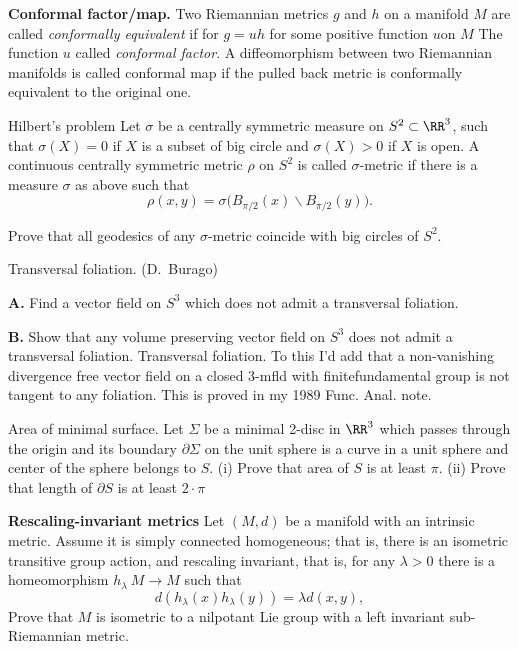 \item{\bf Conformal factor/map.} Two Riemannian metrics $g$ and $h$ on a manifold $M$ are called {\it conformally equivalent} if for $g=u h$ for some positive function $u$on $M$
The function $u$ called {\it conformal factor}.
A diffeomorphism between two Riemannian manifolds is called conformal map if the pulled back metric is conformally equivalent to the original one.

\begin{pr}{}{Hilbert's problem} Let $\sigma$ be a centrally
symmetric measure on $S^2\subset \RR^3$, such that $\sigma(X)=0$ if $X$ is a
subset of big circle and $\sigma(X)>0$ if $X$ is open.
A continuous centrally symmetric metric $\rho$ on $S^2$
is called $\sigma$-metric
if there is a measure $\sigma$ as above such that
$$\rho(x,y)=\sigma\bigl(B_{\pi/2}(x)\backslash B_{\pi/2}(y)\bigr).$$

Prove that all geodesics of any $\sigma$-metric coincide with big circles
of $S^2$.
\end{pr}

\begin{pr}{}
{Transversal foliation.} (D.~Burago)

{\bf A.} Find a vector field on $S^3$ which does not admit a transversal foliation.

{\bf B.} Show that any volume preserving vector field on $S^3$ does not admit a transversal foliation.
Transversal foliation. To this I'd add that a non-vanishing divergence free vector field on a closed 3-mfld with finitefundamental group is not tangent to any foliation. This is proved in my 1989 Func. Anal. note.
\end{pr}

\begin{pr}{}{Area of minimal surface.} Let $\Sigma$ be a minimal 2-disc in $\RR^3$ which passes through the origin and its boundary $\partial\Sigma$ on the unit sphere is a curve in a unit sphere and center of the sphere belongs to $S$.
(i) Prove that area of $S$ is at least $\pi$.
(ii) Prove that length of $\partial S$ is at least $2\cdot\pi$
\end{pr}

\begin{pr}
{\bf  Rescaling-invariant metrics} Let $(M,d)$ be a manifold with an intrinsic metric. 
Assume it is simply connected homogeneous; 
that is, there is an isometric transitive group action, and rescaling invariant, 
that is, for any $\lambda>0$ there is a homeomorphism $h_\lambda\:M\to M$ such that $$d(h_\lambda(x)h_\lambda(y))=\lambda d(x,y),$$ Prove that $M$ is isometric to a nilpotant Lie group with a left invariant sub-Riemannian metric.
\end{pr}

